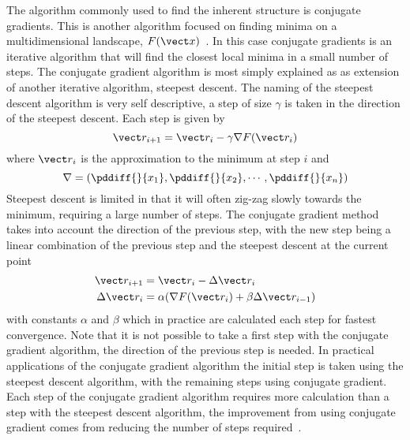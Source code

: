 The algorithm commonly used to find the inherent structure is conjugate gradients\tocite. This is another algorithm focused on finding minima on a multidimensional landscape, $F(\vect x)$~\cite{shewchuk:94,hestenes:52}. In this case conjugate gradients is an iterative algorithm that will find the closest local minima in a small number of steps. The conjugate gradient algorithm is most simply explained as as extension of another iterative algorithm, steepest descent. The naming of the steepest descent algorithm is very self descriptive, a step of size $\gamma$ is taken in the direction of the steepest descent. Each step is given by
\begin{equation}
    \vect r_{i+1} = \vect r_i - \gamma \nabla F(\vect r_i)
\end{equation}
where $\vect r_i$ is the approximation to the minimum at step $i$ and
\begin{equation}
    \nabla = \left (\pddiff{}{x_1}, \pddiff{}{x_2},\cdots,\pddiff{}{x_n} \right )
\end{equation}
Steepest descent is limited in that it will often zig-zag slowly towards the minimum, requiring a large number of steps. The conjugate gradient method takes into account the direction of the previous step, with the new step being a linear combination of the previous step and the steepest descent at the current point
\begin{align}
    \vect r_{i+1} &= \vect r_{i} - \Delta \vect r_i \\
     \Delta \vect r_{i} &= \alpha( \nabla F(\vect r_i) + \beta \Delta \vect r_{i-1})
\end{align}
with constants $\alpha$ and $\beta$ which in practice are calculated each step for fastest convergence. Note that it is not possible to take a first step with the conjugate gradient algorithm, the direction of the previous step is needed. In practical applications of the conjugate gradient algorithm the initial step is taken using the steepest descent algorithm, with the remaining steps using conjugate gradient. Each step of the conjugate gradient algorithm requires more calculation than a step with the steepest descent algorithm, the improvement from using conjugate gradient comes from reducing the number of steps required~\cite{knyazev:08}.

